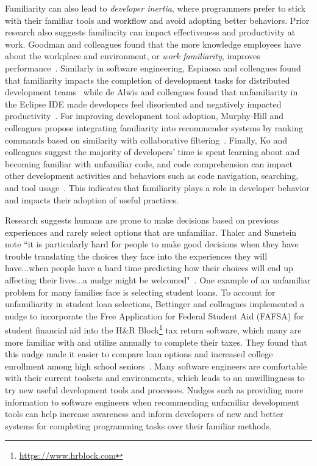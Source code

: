 Familiarity can also lead to \textit{developer inertia}, where programmers prefer to stick with their familiar tools and workflow and avoid adopting better behaviors. Prior research also suggests familiarity can impact effectiveness and productivity at work. Goodman and colleagues found that the more knowledge employees have about the workplace and environment, or \textit{work familiarity}, improves performance~\cite{goodman1992familiarity}. Similarly in software engineering, Espinosa and colleagues found that familiarity impacts the completion of development tasks for distributed development teams~\cite{espinosa2002shared} while de Alwis and colleagues found that unfamiliarity in the Eclipse IDE made developers feel disoriented and negatively impacted productivity~\cite{de2006using}. For improving development tool adoption, Murphy-Hill and colleagues propose integrating familiarity into recommender systems by ranking commands based on similarity with collaborative filtering~\cite{Murphy-Hill2012Fluency}. Finally, Ko and colleagues suggest the majority of developers' time is spent learning about and becoming familiar with unfamiliar code, and code comprehension can impact other development activities and behaviors such as code navigation, searching, and tool usage~\cite{ko2006exploratory}. This indicates that familiarity plays a role in developer behavior and impacts their adoption of useful practices.

Research suggests humans are prone to make decisions based on previous experiences and rarely select options that are unfamiliar. Thaler and Sunstein note ``it is particularly hard for people to make good decisions when they have trouble translating the choices they face into the experiences they will have...when people have a hard time predicting how their choices will end up affecting their lives...a nudge might be welcomed"~\cite[p.~77-78]{sunstein2008nudge}. One example of an unfamiliar problem for many families face is selecting student loans. To account for unfamiliarity in student loan selections, Bettinger and colleagues implemented a nudge to incorporate the Free Application for Federal Student Aid (FAFSA) for student financial aid into the H&R Block\footnote{\url{https://www.hrblock.com}} tax return software, which many are more familiar with and utilize annually to complete their taxes. They found that this nudge made it easier to compare loan options and increased college enrollment among high school seniors~\cite{bettinger2013fafsa}. Many software engineers are comfortable with their current toolsets and environments, which leads to an unwillingness to try new useful development tools and processes. Nudges such as providing more information to software engineers when recommending unfamiliar development tools can help increase awareness and inform developers of new and better systems for completing programming tasks over their familiar methods.



